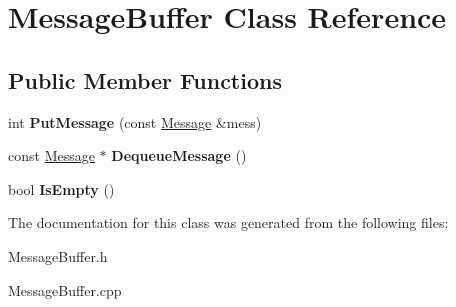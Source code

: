 \hypertarget{class_message_buffer}{}\section{Message\+Buffer Class Reference}
\label{class_message_buffer}
\subsection*{Public Member Functions}
\begin{DoxyCompactItemize}
\item 
\hypertarget{class_message_buffer_ac33a6159360e5c26ad3fb505dcbc1daa}{}int {\bfseries Put\+Message} (const \hyperlink{class_message}{Message} \&mess)\label{class_message_buffer_ac33a6159360e5c26ad3fb505dcbc1daa}

\item 
\hypertarget{class_message_buffer_aa2e65f7885fab04a09a94f0b4341afc2}{}const \hyperlink{class_message}{Message} $\ast$ {\bfseries Dequeue\+Message} ()\label{class_message_buffer_aa2e65f7885fab04a09a94f0b4341afc2}

\item 
\hypertarget{class_message_buffer_adfe17df060b3be51759e76a9a6315718}{}bool {\bfseries Is\+Empty} ()\label{class_message_buffer_adfe17df060b3be51759e76a9a6315718}

\end{DoxyCompactItemize}


The documentation for this class was generated from the following files\+:\begin{DoxyCompactItemize}
\item 
Message\+Buffer.\+h\item 
Message\+Buffer.\+cpp\end{DoxyCompactItemize}
